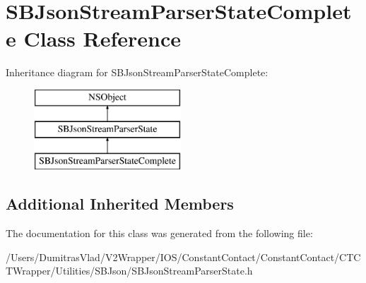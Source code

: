 \hypertarget{interface_s_b_json_stream_parser_state_complete}{\section{S\-B\-Json\-Stream\-Parser\-State\-Complete Class Reference}
\label{interface_s_b_json_stream_parser_state_complete}
}
Inheritance diagram for S\-B\-Json\-Stream\-Parser\-State\-Complete\-:\begin{figure}[H]
\begin{center}
\leavevmode
\includegraphics[height=3.000000cm]{interface_s_b_json_stream_parser_state_complete}
\end{center}
\end{figure}
\subsection*{Additional Inherited Members}


The documentation for this class was generated from the following file\-:\begin{DoxyCompactItemize}
\item 
/\-Users/\-Dumitras\-Vlad/\-V2\-Wrapper/\-I\-O\-S/\-Constant\-Contact/\-Constant\-Contact/\-C\-T\-C\-T\-Wrapper/\-Utilities/\-S\-B\-Json/S\-B\-Json\-Stream\-Parser\-State.\-h\end{DoxyCompactItemize}
